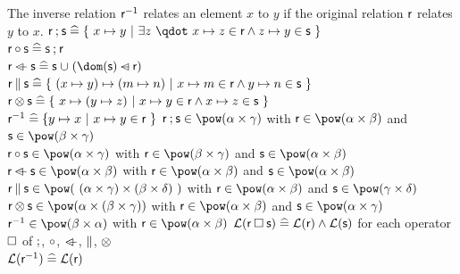 \begin{samepage}
\begin{rodinrefentry}
    The inverse relation $\textsf{r}^{-1}$ relates an element $x$ to $y$ if the original relation $\textsf{r}$
    relates $y$ to $x$.
  \rrdef
    $\exprlr\fcomp\exprls \defi \{~x \mapsto y~|~\exists z~\qdot~x \mapsto z \in\exprlr \land z \mapsto y\in\exprls~\}$\\
    $\textsf{r}\circ\textsf{s} \mathrel{\widehat=} \textsf{s}\mathbin;\textsf{r}$\\
    $\exprlr\ovl\exprls \defi \exprls\bunion (\dom(\exprls)\domsub\exprlr)$\\
    $\textsf{r}\mathbin\|\textsf{s} \mathrel{\widehat=} \{~(x\mapsto y)\mapsto(m\mapsto n)~|~x\mapsto m\in\textsf{r}\land y\mapsto n\in\textsf{s} ~\}$\\
    $\textsf{r}\mathbin\otimes\textsf{s} \mathrel{\widehat=} \{~x\mapsto(y\mapsto z)~|~x\mapsto y\in\textsf{r} \land x\mapsto z\in\textsf{s} ~\}$\\
    $\textsf{r}^{-1} \mathrel{\widehat=} \{y\mapsto x~|~x\mapsto y\in\textsf{r}~\}$
  \rrtypes
    $\exprlr\fcomp\exprls\in\pow(\alpha\cprod\gamma)$ with $\exprlr\in\pow(\alpha\cprod\beta)$ and
      $\exprls\in\pow(\beta\cprod\gamma)$\\
    $\exprlr\bcomp\exprls\in\pow(\alpha\cprod\gamma)$ with $\exprlr\in\pow(\beta\cprod\gamma)$ and
      $\exprls\in\pow(\alpha\cprod\beta)$\\
    $\exprlr\ovl\exprls\in\pow(\alpha\cprod\beta)$ with $\exprlr\in\pow(\alpha\cprod\beta)$ and
      $\exprls\in\pow(\alpha\cprod\beta)$\\
    $\exprlr\pprod\exprls\in\pow(~(\alpha\cprod\gamma)\cprod(\beta\cprod\delta)~)$ with
      $\exprlr\in\pow(\alpha\cprod\beta)$ and
      $\exprls\in\pow(\gamma\cprod\delta)$\\
    $\exprlr\dprod\exprls\in\pow(\alpha\cprod(\beta\cprod\gamma))$ with $\exprlr\in\pow(\alpha\cprod\beta)$ and
      $\exprls\in\pow(\alpha\cprod\gamma)$\\
    $\exprlr^{-1}\in\pow(\beta\cprod\alpha)$ with $\exprlr\in\pow(\alpha\cprod\beta)$
  \rrwd
    $\mathcal{L}(\textsf{r}\mathbin{\Box}\textsf{s})\mathrel{\widehat=}\mathcal{L}(\textsf{r})\land\mathcal{L}(\textsf{s})$ for each operator $\mathbin{\Box}$ of
    $\mathbin;$, $\circ$, $\mathbin{\lhd\mkern-9mu-}$, $\mathbin\|$, $\mathbin\otimes$\\
    $\mathcal{L}(\textsf{r}^{-1})\mathrel{\widehat=}\mathcal{L}(\textsf{r})$
\end{rodinrefentry}
\end{samepage}

